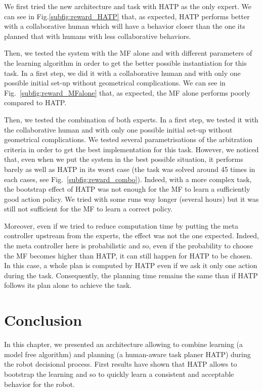 \documentclass[english,a4paper,11pt,twoside]{StyleThese}
\begin{document}
We first tried the new architecture and task with HATP as the only expert. We can see in Fig.\ref{subfig:reward_HATP} that, as expected, HATP performs better with a collaborative human which will have a behavior closer than the one its planned that with humans with less collaborative behaviors. 

Then, we tested the system with the MF alone and with different parameters of the learning algorithm in order to get the better possible instantiation for this task. In a first step, we did it with a collaborative human and with only one possible initial set-up without geometrical complications. We can see in Fig.~\ref{subfig:reward_MFalone} that, as expected, the MF alone performs poorly compared to HATP.

Then, we tested the combination of both experts. In a first step, we tested it with the collaborative human and with only one possible initial set-up without geometrical complications. We tested several parametrisations of the arbitration criteria in order to get the best implementation for this task. However, we noticed that, even when we put the system in the best possible situation, it performs barely as well as HATP in its worst case (the task was solved around 45 times in each cases, see Fig.~\ref{subfig:reward_combo}). Indeed, with a more complex task, the bootstrap effect of HATP was not enough for the MF to learn a sufficiently good action policy. We tried with some runs way longer (several hours) but it was still not sufficient for the MF to learn a correct policy. 

Moreover, even if we tried to reduce computation time by putting the meta controller upstream from the experts, the effect was not the one expected. Indeed, the meta controller here is probabilistic and so, even if the probability to choose the MF becomes higher than HATP, it can still happen for HATP to be chosen. In this case, a whole plan is computed by HATP even if we ask it only one action during the task. Consequently, the planning time remains the same than if HATP follows its plan alone to achieve the task.

\section{Conclusion}

In this chapter, we presented an architecture allowing to combine learning (a model free algorithm) and planning (a human-aware task planer HATP) during the robot decisional process. First results have shown that HATP allows to bootstrap the learning and so to quickly learn a consistent and acceptable behavior for the robot.
\end{document}

